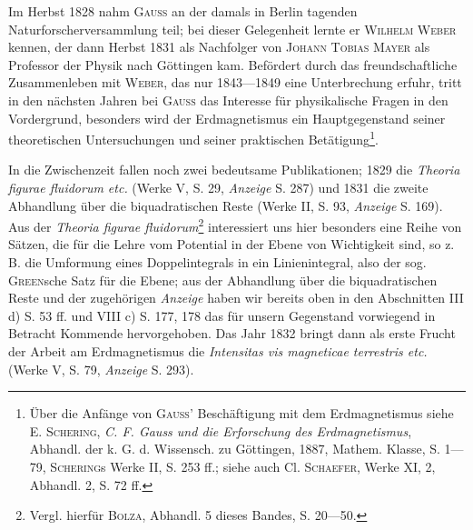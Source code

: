 Im Herbst 1828 nahm \textsc{Gauss} an der damals in Berlin tagenden Naturforscherversammlung
teil; bei dieser Gelegenheit lernte er \textsc{Wilhelm Weber}
kennen, der dann Herbst 1831 als Nachfolger von \textsc{Johann Tobias Mayer} als
Professor der Physik nach Göttingen kam. Befördert durch das freundschaftliche
Zusammenleben mit \textsc{Weber}, das nur 1843—1849 eine Unterbrechung
erfuhr, tritt in den nächsten Jahren bei \textsc{Gauss} das Interesse für physikalische
Fragen in den Vordergrund, besonders wird der Erdmagnetismus ein Hauptgegenstand
seiner theoretischen Untersuchungen und seiner praktischen Betätigung\footnote{Über die Anfänge von \textsc{Gauss}' Beschäftigung mit dem Erdmagnetismus siehe E. \textsc{Schering}, \textit{C. F. Gauss und die Erforschung des Erdmagnetismus}, Abhandl. der k. G. d. Wissensch. zu Göttingen, 1887, Mathem. Klasse, S. 1—79, \textsc{Schering}s Werke II, S. 253 ff.; siehe auch Cl. \textsc{Schaefer}, Werke XI, 2, Abhandl. 2, S. 72 ff.}.

In die Zwischenzeit fallen noch zwei bedeutsame Publikationen; 1829 die
\textit{Theoria figurae fluidorum etc.} (Werke V, S. 29, \textit{Anzeige} S. 287) und 1831 die
zweite Abhandlung über die biquadratischen Reste (Werke II, S. 93, \textit{Anzeige}
S. 169). Aus der \textit{Theoria figurae fluidorum}\footnote{Vergl. hierfür \textsc{Bolza}, Abhandl. 5 dieses Bandes, S. 20—50.} interessiert uns hier besonders
eine Reihe von Sätzen, die für die Lehre vom Potential in der Ebene von
Wichtigkeit sind, so z. B. die Umformung eines Doppelintegrals in ein Linienintegral,
also der sog. \textsc{Green}sche Satz für die Ebene; aus der Abhandlung
über die biquadratischen Reste und der zugehörigen \textit{Anzeige} haben wir bereits
oben in den Abschnitten III d) S. 53 ff. und VIII c) S. 177, 178 das für unsern
Gegenstand vorwiegend in Betracht Kommende hervorgehoben. Das Jahr 1832
bringt dann als erste Frucht der Arbeit am Erdmagnetismus die \textit{Intensitas vis
magneticae terrestris etc.} (Werke V, S. 79, \textit{Anzeige} S. 293).

